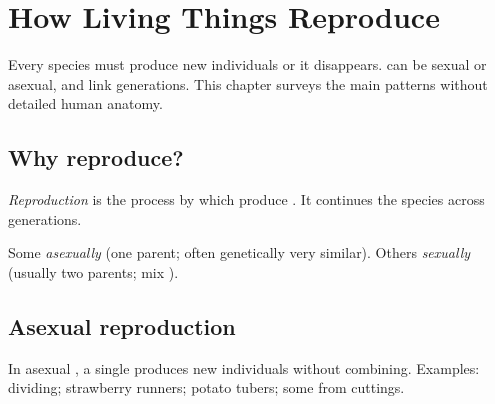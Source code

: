 \chapter{How Living Things Reproduce}\label{ch:g5:reproduction}

Every species must produce new individuals or it disappears. 
can be sexual or asexual, and  link generations. This chapter
surveys the main patterns without detailed human anatomy.

\section{Why reproduce?}

\begin{definition}[Reproduction]\label{def:g5:reproduction:def}
\emph{Reproduction} is the process by which  produce . It continues the species across generations.
\end{definition}

\begin{proposition}\label{prop:g5:reproduction:two}
Some   \emph{asexually}
(one parent;  often genetically very similar). Others
 \emph{sexually} (usually two
parents;  mix ).
\end{proposition}
\admitted

\section{Asexual reproduction}

\begin{definition}\label{def:g5:reproduction:asexual}
In asexual , a single  produces new individuals
without  combining. Examples:  dividing; strawberry
runners; potato tubers; some  from cuttings.
\end{definition}

